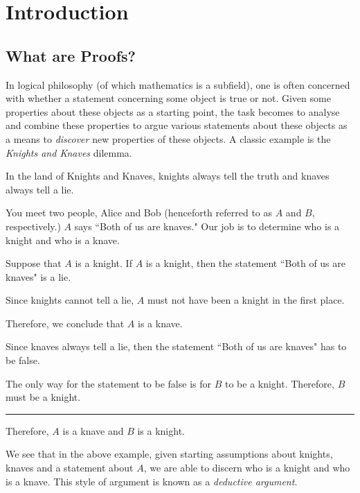 \documentclass[../proofs.tex]{subfiles}
\newcommand{\hrulesmall}{\rule{0.4\textwidth}{1pt}}
\begin{document}
\chapter{Introduction}
\section{What are Proofs?}
In logical philosophy (of which mathematics is a subfield), one is often
concerned with whether a statement concerning some object is true or not. Given
some properties about these objects as a starting point, the task becomes to
analyse and combine these properties to argue various statements about these
objects as a means to \emph{discover} new properties of these objects. A classic
example is the \textit{Knights and Knaves} dilemma.

\begin{expl}
In the land of Knights and Knaves, knights always tell the truth and
  knaves always tell a lie.

You meet two people, Alice and Bob (henceforth referred to as $A$ and $B$,
respectively.) $A$ says ``Both of us are knaves." Our job is to determine who
is a knight and who is a knave.

\begin{list}{}{}
  \item Suppose that $A$ is a knight. If $A$ is a knight, then the statement
        ``Both of us are knaves" is a lie.
  \item Since knights cannot tell a lie, $A$ must not have been a knight in the
        first place.
  \item Therefore, we conclude that $A$ is a knave.
  \item Since knaves always tell a lie, then the statement ``Both of us are
        knaves" has to be false.
  \item The only way for the statement to be false is for $B$ to be a knight.
        Therefore, $B$ must be a knight.
  \item \hrulesmall
  \item Therefore, $A$ is a knave and $B$ is a knight.
\end{list}
\end{expl}

We see that in the above example, given starting assumptions about knights,
knaves and a statement about $A$, we are able to discern who is a knight and
who is a knave. This style of argument is known as a \emph{deductive argument}.
\end{document}

